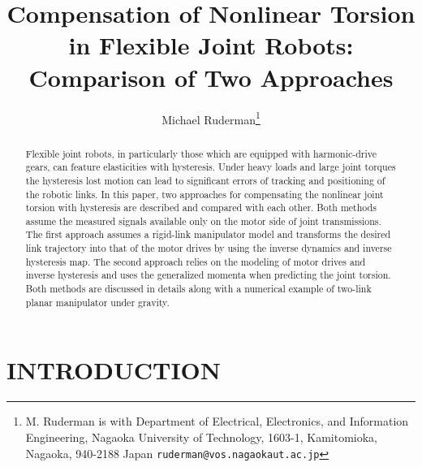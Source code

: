 \documentclass[a4paper, 10pt, conference]{ieeeconf}
\title{\LARGE \bf
Compensation of Nonlinear Torsion in Flexible Joint Robots:
Comparison of Two Approaches}
\author{Michael Ruderman\thanks{M. Ruderman is with Department of Electrical, Electronics, and Information Engineering,
Nagaoka University of Technology, 1603-1, Kamitomioka, Nagaoka,
940-2188 Japan {\tt\small ruderman@vos.nagaokaut.ac.jp}}}
\begin{document}
\maketitle
\thispagestyle{empty}
\pagestyle{empty}



\begin{abstract}
Flexible joint robots, in particularly those which are equipped
with harmonic-drive gears, can feature elasticities with
hysteresis. Under heavy loads and large joint torques the
hysteresis lost motion can lead to significant errors of tracking
and positioning of the robotic links. In this paper, two
approaches for compensating the nonlinear joint torsion with
hysteresis are described and compared with each other. Both
methods assume the measured signals available only on the motor
side of joint transmissions. The first approach assumes a
rigid-link manipulator model and transforms the desired link
trajectory into that of the motor drives by using the inverse
dynamics and inverse hysteresis map. The second approach relies on
the modeling of motor drives and inverse hysteresis and uses the
generalized momenta when predicting the joint torsion. Both
methods are discussed in details along with a numerical example of
two-link planar manipulator under gravity.
\end{abstract}










\section{INTRODUCTION}
\label{sec:1}
\end{document}
